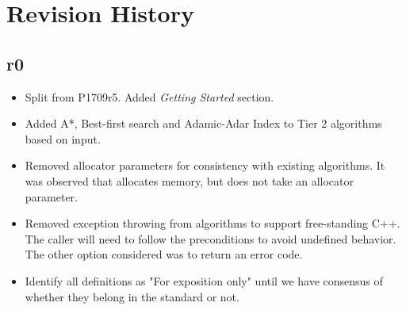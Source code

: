 \section{Revision History}

\subsection*{\paperno r0}

\begin{itemize}
      \item Split from P1709r5. Added \textit{Getting Started} section.
      \item Added A*, Best-first search and Adamic-Adar Index to Tier 2 algorithms based on input.
      \item Removed allocator parameters for consistency with existing algorithms. It was observed that  
            allocates memory, but does not take an allocator parameter.
      \item Removed exception throwing from algorithms to support free-standing C++. The caller will need to
            follow the preconditions to avoid undefined behavior. The other option considered was to return
            an error code.
      \item Identify all  definitions as "For exposition only" until we have consensus of whether they 
            belong in the standard or not.
\end{itemize}

